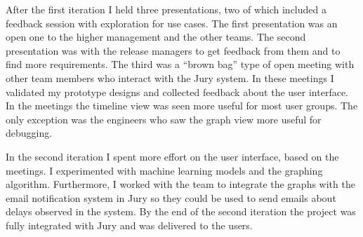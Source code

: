 After the first iteration I held three presentations, two of which included a feedback session with exploration for use cases. The first presentation was an open one to the higher management and the other teams. The second presentation was with the release managers to get feedback from them and to find more requirements. The third was a ``brown bag'' type of open meeting with other team members who interact with the Jury system.
In these meetings I validated my prototype designs and collected feedback about the user interface.
In the meetings the timeline view was seen more useful for most user groups.
The only exception was the engineers who saw the graph view more useful for debugging.

In the second iteration I spent more effort on the user interface, based on the meetings.
I experimented with machine learning models and the graphing algorithm.
Furthermore, I worked with the team to integrate the graphs with the email notification system in Jury so they could be used to send emails about delays observed in the system. 
By the end of the second iteration the project was fully integrated with Jury and was delivered to the users.